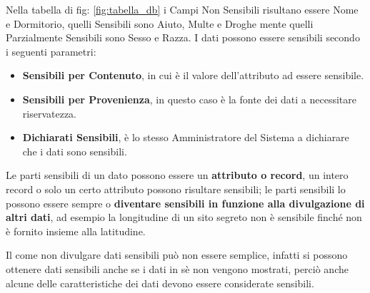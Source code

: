 Nella tabella di fig: \ref{fig:tabella_db} i Campi Non Sensibili risultano essere Nome e Dormitorio, quelli Sensibili sono Aiuto, Multe e Droghe mente quelli Parzialmente Sensibili sono Sesso e Razza.
I dati possono essere sensibili secondo i seguenti parametri:
\begin{itemize}

	\item \textbf{Sensibili per Contenuto}, in cui è il valore dell'attributo ad essere sensibile.
	\item \textbf{Sensibili per Provenienza}, in questo caso è la fonte dei dati a necessitare riservatezza.
	\item \textbf{Dichiarati Sensibili}, è lo stesso Amministratore del Sistema a dichiarare che i dati sono sensibili.
	
\end{itemize}

Le parti sensibili di un dato possono essere un \textbf{attributo o record}, un intero record o solo un certo attributo possono risultare sensibili; le parti sensibili lo possono essere sempre o \textbf{diventare sensibili in funzione alla divulgazione di altri dati}, ad esempio la longitudine di un sito segreto non è sensibile finché non è fornito insieme alla latitudine.

Il come non divulgare dati sensibili può non essere semplice, infatti si possono ottenere dati sensibili anche se i dati in sè non vengono mostrati, perciò anche alcune delle caratteristiche dei dati devono essere considerate sensibili.

